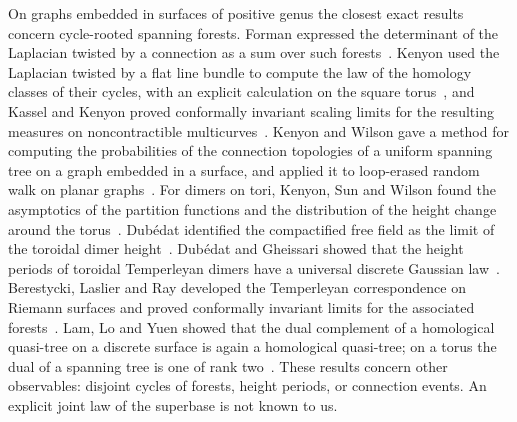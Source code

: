 \documentclass[11pt]{amsart}
\theoremstyle{definition}
\theoremstyle{remark}
\begin{document}
On graphs embedded in surfaces of positive genus the closest exact results concern cycle-rooted spanning forests. Forman
expressed the determinant of the Laplacian twisted by a connection as a sum over such forests~\cite{For93}. Kenyon used
the Laplacian twisted by a flat line bundle to compute the law of the homology classes of their cycles, with an explicit
calculation on the square torus~\cite{Ken11}, and Kassel and Kenyon proved conformally invariant scaling limits for the
resulting measures on noncontractible multicurves~\cite{KK17}. Kenyon and Wilson gave a method for computing the
probabilities of the connection topologies of a uniform spanning tree on a graph embedded in a surface, and applied it
to loop-erased random walk on planar graphs~\cite{KW15}. For dimers on tori, Kenyon, Sun and Wilson found the
asymptotics of the partition functions and the distribution of the height change around the torus~\cite{KSW16}.
Dub\'edat identified the compactified free field as the limit of the toroidal dimer height~\cite{Dub15}. Dub\'edat and
Gheissari showed that the height periods of toroidal Temperleyan dimers have a universal discrete Gaussian
law~\cite{DG15}. Berestycki, Laslier and Ray developed the Temperleyan correspondence on Riemann surfaces and proved
conformally invariant limits for the associated forests~\cite{BLR25,BLR24}. Lam, Lo and Yuen showed that the dual
complement of a homological quasi-tree on a discrete surface is again a homological quasi-tree; on a torus the dual of
a spanning tree is one of rank two~\cite{LLY26}. These results concern other observables: disjoint cycles of forests,
height periods, or connection events. An explicit joint law of the superbase is not known to us.
\end{document}
